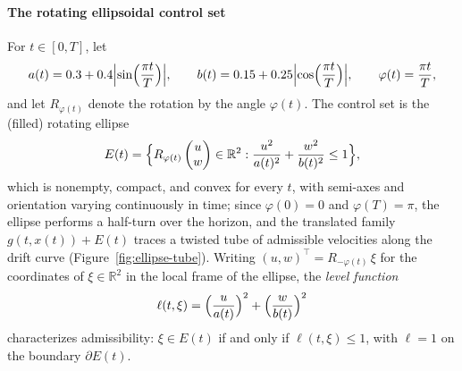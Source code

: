 \documentclass[11pt]{elsarticle}
\theoremstyle{definition}
\theoremstyle{remark}
\numberwithin{equation}{section}
\begin{document}
\paragraph{The rotating ellipsoidal control set}
For $t\in[0,T]$, let
\begin{equation}
	\label{eq:ellipse-axes}
	a(t)=0.3+0.4\Bigl|\sin\Bigl(\frac{\pi t}{T}\Bigr)\Bigr|,
	\qquad
	b(t)=0.15+0.25\Bigl|\cos\Bigl(\frac{\pi t}{T}\Bigr)\Bigr|,
	\qquad
	\varphi(t)=\frac{\pi t}{T},
\end{equation}
and let $R_{\varphi(t)}$ denote the rotation by the angle $\varphi(t)$.
The control set is the (filled) rotating ellipse
\begin{equation}
	\label{eq:ellipse-set}
	E(t)=\Bigl\{R_{\varphi(t)}
	\begin{pmatrix}u\\w\end{pmatrix}\in\mathbb{R}^2:
	\frac{u^2}{a(t)^2}+\frac{w^2}{b(t)^2}\leq 1\Bigr\},
\end{equation}
which is nonempty, compact, and convex for every $t$, with semi-axes and
orientation varying continuously in time; since $\varphi(0)=0$ and
$\varphi(T)=\pi$, the ellipse performs a half-turn over the horizon, and
the translated family $g(t,x(t))+E(t)$ traces a twisted tube of
admissible velocities along the drift curve
(Figure~\ref{fig:ellipse-tube}). Writing
$(u,w)^{\top}=R_{-\varphi(t)}\,\xi$ for the coordinates of
$\xi\in\mathbb{R}^2$ in the local frame of the ellipse, the
\emph{level function}
\begin{equation}
	\label{eq:ellipse-level}
	\ell(t,\xi)
	=\Bigl(\frac{u}{a(t)}\Bigr)^2+\Bigl(\frac{w}{b(t)}\Bigr)^2
\end{equation}
characterizes admissibility: $\xi\in E(t)$ if and only if
$\ell(t,\xi)\le1$, with $\ell=1$ on the boundary $\partial E(t)$.
\end{document}
